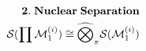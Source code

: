 \documentclass[preview]{standalone}
\begin{document}
\begin{align*}
\special{dvisvgm:raw <g id='unique000'>}\mathbf{2.\;Nuclear\;Separation}\\\mathcal{S}(\prod\mathcal{M}_1^{(i)})\cong\widehat{\bigotimes}_\pi\mathcal{S}(\mathcal{M}_1^{(i)})\special{dvisvgm:raw </g>}
\end{align*}
\end{document}
